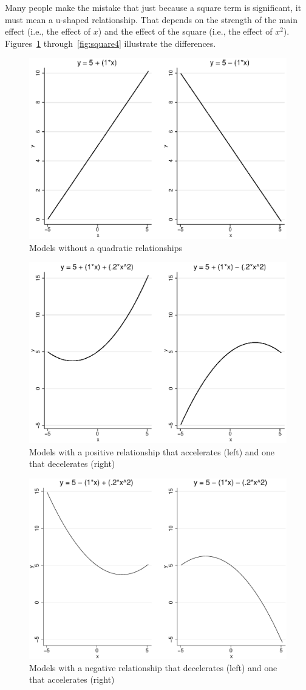 Many people make the mistake that just because a square term is significant, it must mean a u-shaped relationship. That depends on the strength of the main effect (i.e., the effect of $x$) and the effect of the square (i.e., the effect of $x^2$). Figures~\ref{fig:square1} through~\ref{fig:square4} illustrate the differences.
\begin{figure}
   \centering
   \includegraphics[angle=0,
           width=.75\textwidth]{square1.eps}
   \caption{Models without a quadratic relationships}
  \label{fig:square1}
\end{figure}
\begin{figure}
   \centering
   \includegraphics[angle=0,
           width=.75\textwidth]{square2.eps}
   \caption{Models with a positive relationship that accelerates (left) and one that decelerates (right)}
  \label{fig:square2}
\end{figure}
\begin{figure}
   \centering
   \includegraphics[angle=0,
           width=.75\textwidth]{square3.eps}
   \caption{Models with a negative relationship that decelerates (left) and one that accelerates (right)}
  \label{fig:square3}
\end{figure}
